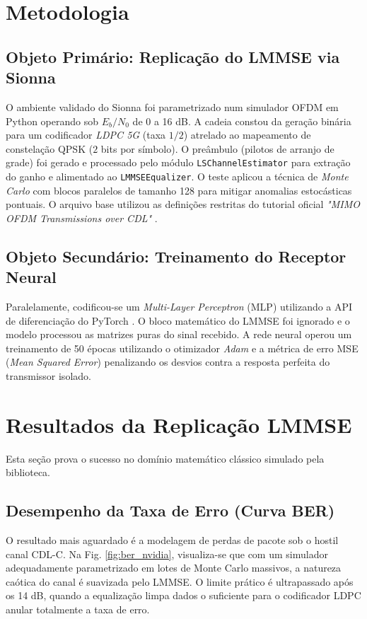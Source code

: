\documentclass[conference]{IEEEtran}
\begin{document}
\section{Metodologia}

\subsection{Objeto Primário: Replicação do LMMSE via Sionna}
O ambiente validado do Sionna foi parametrizado num simulador OFDM em Python operando sob $E_b/N_0$ de 0 a 16 dB.
A cadeia constou da geração binária para um codificador \textit{LDPC 5G} (taxa $1/2$) atrelado ao mapeamento de constelação QPSK ($2$ bits por símbolo). O preâmbulo (pilotos de arranjo de grade) foi gerado e processado pelo módulo \texttt{LSChannelEstimator} para extração do ganho e alimentado ao \texttt{LMMSEEqualizer}. O teste aplicou a técnica de \textit{Monte Carlo} com blocos paralelos de tamanho 128 para mitigar anomalias estocásticas pontuais. O arquivo base utilizou as definições restritas do tutorial oficial \textit{"MIMO OFDM Transmissions over CDL"} \cite{sionna_tutorial}.

\subsection{Objeto Secundário: Treinamento do Receptor Neural}
Paralelamente, codificou-se um \textit{Multi-Layer Perceptron} (MLP) utilizando a API de diferenciação do PyTorch \cite{cammerer2023}. O bloco matemático do LMMSE foi ignorado e o modelo processou as matrizes puras do sinal recebido. A rede neural operou um treinamento de 50 épocas utilizando o otimizador \textit{Adam} e a métrica de erro MSE (\textit{Mean Squared Error}) penalizando os desvios contra a resposta perfeita do transmissor isolado.

\section{Resultados da Replicação LMMSE}

Esta seção prova o sucesso no domínio matemático clássico simulado pela biblioteca.

\subsection{Desempenho da Taxa de Erro (Curva BER)}
O resultado mais aguardado é a modelagem de perdas de pacote sob o hostil canal CDL-C. Na Fig. \ref{fig:ber_nvidia}, visualiza-se que com um simulador adequadamente parametrizado em lotes de Monte Carlo massivos, a natureza caótica do canal é suavizada pelo LMMSE. O limite prático é ultrapassado após os 14 dB, quando a equalização limpa dados o suficiente para o codificador LDPC anular totalmente a taxa de erro.
\end{document}
